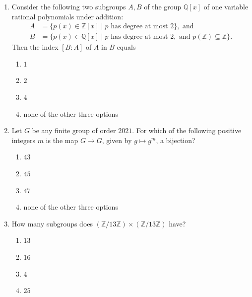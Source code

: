\documentclass[11pt, a4paper]{article}
\begin{document}
\begin{enumerate}
  \item Consider the following two subgroups $A, B$ of the group $\mathbb{Q}[x]$ of one variable rational polynomials under addition:
  \begin{align*}
    A &= \{p(x) \in \mathbb{Z}[x] \mid p \text{ has degree at most } 2\}, \text{ and} \\
    B &= \{p(x) \in \mathbb{Q}[x] \mid p \text{ has degree at most } 2, \text{ and } p(\mathbb{Z}) \subseteq \mathbb{Z}\}.
  \end{align*}
  Then the index $[B : A]$ of $A$ in $B$ equals
  \begin{enumerate}[label=(\alph*)]
    \item $1$
    \item $2$
    \item $4$
    \item none of the other three options
  \end{enumerate}

  \item Let $G$ be any finite group of order $2021$. For which of the following positive integers $m$ is the map $G \to G$, given by $g \mapsto g^m$, a bijection?
  \begin{enumerate}[label=(\alph*)]
    \item $43$
    \item $45$
    \item $47$
    \item none of the other three options
  \end{enumerate}

  \item How many subgroups does $(\mathbb{Z}/13\mathbb{Z}) \times (\mathbb{Z}/13\mathbb{Z})$ have?
  \begin{enumerate}[label=(\alph*)]
    \item $13$
    \item $16$
    \item $4$
    \item $25$
  \end{enumerate}
\end{enumerate}
\end{document}
